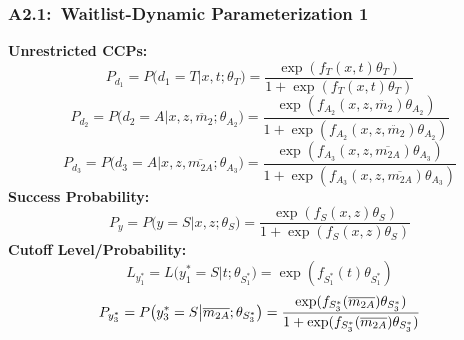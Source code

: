 \documentclass[12pt, aspectratio=169]{beamer}
\begin{document}
\begin{frame}[label=wdp1]
\frametitle{A2.1:\ Waitlist-Dynamic Parameterization 1}
\textbf{Unrestricted CCPs:}
\vspace{-5pt}
\footnotesize
\begin{equation*}
P_{d_1} = P\big(d_1=T\big|x,t;\theta_T\big) = \frac{\exp(f_T(x,t)\theta_T)}{1+\exp(f_T(x,t)\theta_T)}
\end{equation*}
\begin{equation*}
P_{d_2} = P\big(d_2=A\big|x,z,\ddot{m_2};\theta_{A_2}\big) = \frac{\exp(f_{A_2}(x,z,\ddot{m_2})\theta_{A_2})}{1+\exp(f_{A_2}(x,z,\ddot{m_2})\theta_{A_2})}
\end{equation*}
\begin{equation*}
P_{d_3} = P\big(d_3=A\big|x,z,\overline{m_{2A}};\theta_{A_3}\big) = \frac{\exp(f_{A_3}(x,z,\overline{m_{2A}})\theta_{A_3})}{1+\exp(f_{A_3}(x,z,\overline{m_{2A}})\theta_{A_3})}
\end{equation*}
\normalsize
\textbf{Success Probability:}
\vspace{-5pt}
\footnotesize
\begin{equation*}
P_y = P\big(y = S\big|x,z;\theta_S\big) = \frac{\exp(f_S(x,z)\theta_S)}{1+\exp(f_S(x,z)\theta_S)}
\end{equation*}
\normalsize
\textbf{Cutoff Level/Probability:}
\vspace{-5pt}
\footnotesize
\begin{equation*}
L_{y_1^*} = L\big(y_1^* = S\big|t;\theta_{S_1^*}\big) = \exp(f_{S_1^*}(t)\theta_{S_1^*})
\end{equation*}
\begin{equation*}
P_{y_3^*} = P\big(y_3^* = S\big|\overline{m_{2A}};\theta_{S_3^*}\big) = \frac{\exp(f_{S_3^*}(\overline{m_{2A}})\theta_{S_3^*})}{1+\exp(f_{S_3^*}(\overline{m_{2A}})\theta_{S_3^*})}
\vspace{-5pt}
\end{equation*}
\normalsize
\hyperlink{wmo}{}
\end{frame}
\end{document}
